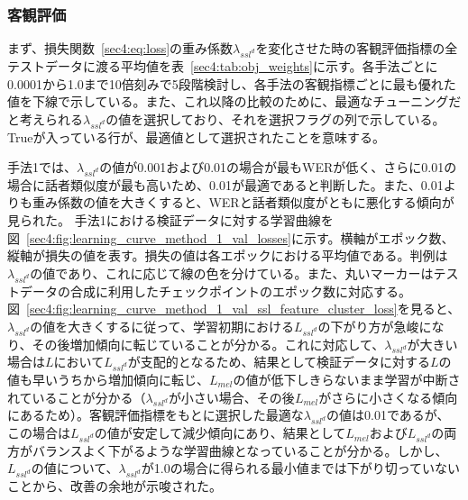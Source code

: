 \documentclass[12pt]{jarticle}
\numberwithin{equation}{section}    %
\numberwithin{figure}{section}      %
\numberwithin{table}{section}      %
\begin{document}
\subsubsection{客観評価}
まず、損失関数~\eqref{sec4:eq:loss}の重み係数$\lambda_{ssl^{d}}$を変化させた時の客観評価指標の全テストデータに渡る平均値を表~\ref{sec4:tab:obj_weights}に示す。各手法ごとに0.0001から1.0まで10倍刻みで5段階検討し、各手法の客観指標ごとに最も優れた値を下線で示している。また、これ以降の比較のために、最適なチューニングだと考えられる$\lambda_{ssl^{d}}$の値を選択しており、それを選択フラグの列で示している。Trueが入っている行が、最適値として選択されたことを意味する。

手法1では、$\lambda_{ssl^{d}}$の値が0.001および0.01の場合が最もWERが低く、さらに0.01の場合に話者類似度が最も高いため、0.01が最適であると判断した。また、0.01よりも重み係数の値を大きくすると、WERと話者類似度がともに悪化する傾向が見られた。
手法1における検証データに対する学習曲線を図~\ref{sec4:fig:learning_curve_method_1_val_losses}に示す。横軸がエポック数、縦軸が損失の値を表す。損失の値は各エポックにおける平均値である。判例は$\lambda_{ssl^{d}}$の値であり、これに応じて線の色を分けている。また、丸いマーカーはテストデータの合成に利用したチェックポイントのエポック数に対応する。図~\ref{sec4:fig:learning_curve_method_1_val_ssl_feature_cluster_loss}を見ると、$\lambda_{ssl^{d}}$の値を大きくするに従って、学習初期における$L_{ssl^{d}}$の下がり方が急峻になり、その後増加傾向に転じていることが分かる。これに対応して、$\lambda_{ssl^{d}}$が大きい場合は$L$において$L_{ssl^{d}}$が支配的となるため、結果として検証データに対する$L$の値も早いうちから増加傾向に転じ、$L_{mel}$の値が低下しきらないまま学習が中断されていることが分かる（$\lambda_{ssl^d}$が小さい場合、その後$L_{mel}$がさらに小さくなる傾向にあるため）。客観評価指標をもとに選択した最適な$\lambda_{ssl^{d}}$の値は0.01であるが、この場合は$L_{ssl^{d}}$の値が安定して減少傾向にあり、結果として$L_{mel}$および$L_{ssl^{d}}$の両方がバランスよく下がるような学習曲線となっていることが分かる。しかし、$L_{ssl^{d}}$の値について、$\lambda_{ssl^{d}}$が1.0の場合に得られる最小値までは下がり切っていないことから、改善の余地が示唆された。
\end{document}
